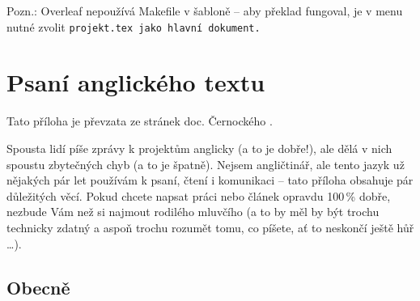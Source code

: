 Pozn.: Overleaf nepoužívá Makefile v šabloně -- aby překlad fungoval, je v menu nutné zvolit \tt projekt.tex \rm jako hlavní dokument.

\chapter{Psaní anglického textu}
\label{anglicky}
Tato příloha je převzata ze stránek doc. Černockého \cite{CernockyEnglish}.

Spousta lidí píše zprávy k projektům anglicky (a to je dobře!), ale dělá v nich spoustu zbytečných chyb (a to je špatně). Nejsem angličtinář, ale tento jazyk už nějakých pár let používám k psaní, čtení i komunikaci -- tato příloha obsahuje pár důležitých věcí. Pokud chcete napsat práci nebo článek opravdu 100\,\% dobře, nezbude Vám než si najmout rodilého mluvčího (a to by měl by být trochu technicky zdatný a aspoň trochu rozumět tomu, co píšete, ať to neskončí ještě hůř \ldots).

\section*{Obecně}


